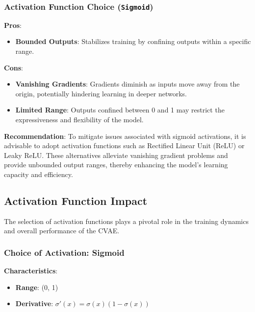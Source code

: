 \documentclass[10pt]{article}
\begin{document}
\subsubsection{Activation Function Choice (\texttt{Sigmoid})}

\textbf{Pros}:

\begin{itemize}
    \item \textbf{Bounded Outputs}: Stabilizes training by confining outputs within a specific range.
\end{itemize}

\textbf{Cons}:

\begin{itemize}
    \item \textbf{Vanishing Gradients}: Gradients diminish as inputs move away from the origin, potentially hindering learning in deeper networks.
    \item \textbf{Limited Range}: Outputs confined between 0 and 1 may restrict the expressiveness and flexibility of the model.
\end{itemize}

\textbf{Recommendation}: To mitigate issues associated with sigmoid activations, it is advisable to adopt activation functions such as Rectified Linear Unit (ReLU) or Leaky ReLU. These alternatives alleviate vanishing gradient problems and provide unbounded output ranges, thereby enhancing the model's learning capacity and efficiency.

\subsection{Activation Function Impact}

The selection of activation functions plays a pivotal role in the training dynamics and overall performance of the CVAE.

\subsubsection{Choice of Activation: Sigmoid}

\textbf{Characteristics}:

\begin{itemize}
    \item \textbf{Range}: (0, 1)
    \item \textbf{Derivative}: \( \sigma'(x) = \sigma(x)(1 - \sigma(x)) \)
\end{itemize}
\end{document}
